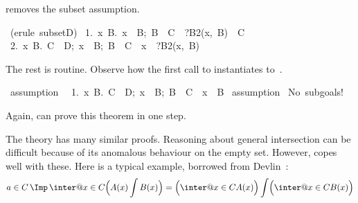  removes the subset assumption.
\begin{isabelle}
\ (erule\ subsetD)\isanewline
\ 1.\ \isasymAnd x\ B.\ \isasymlbrakk x\ \isasymin \ B;\ B\ \isasymin \ C\isasymrbrakk \ \isasymLongrightarrow \ ?B2(x,\ B)\ \isasymin \ C\isanewline
\ 2.\ \isasymAnd x\ B.\ \isasymlbrakk C\ \isasymsubseteq \ D;\ x\ \isasymin \ B;\ B\ \isasymin \ C\isasymrbrakk \ \isasymLongrightarrow \ x\ \isasymin \ ?B2(x,\ B)
\end{isabelle}
The rest is routine.  Observe how the first call to 
instantiates  to~\@.
\begin{isabelle}
\ assumption\ \isanewline
\ 1.\ \isasymAnd x\ B.\ \isasymlbrakk C\ \isasymsubseteq \ D;\ x\ \isasymin \ B;\ B\ \isasymin \ C\isasymrbrakk \ \isasymLongrightarrow \ x\ \isasymin \ B%
\isanewline
{}\ assumption\ \isanewline
No\ subgoals!\isanewline
{}%
\end{isabelle}
Again,  can prove this theorem in one step.

The theory  has many similar proofs.  Reasoning about
general intersection can be difficult because of its anomalous behaviour on
the empty set.  However,  copes well with these.  Here is
a typical example, borrowed from Devlin~\cite[page 12]{devlin79}:
\[ a\in C \,\Imp\, \inter@{x\in C} \Bigl(A(x) \int B(x)\Bigr) =        
       \Bigl(\inter@{x\in C} A(x)\Bigr)  \int  
       \Bigl(\inter@{x\in C} B(x)\Bigr)  \]

